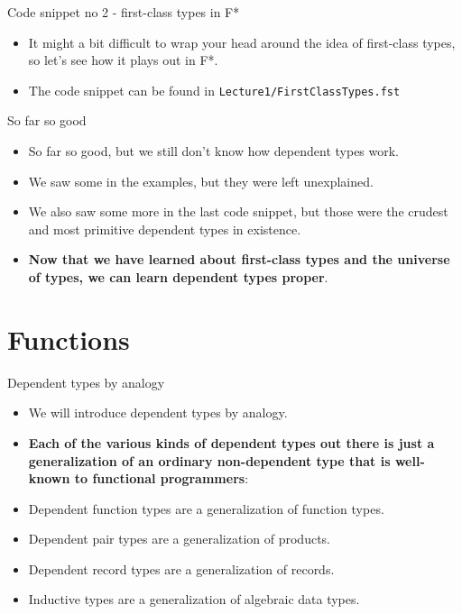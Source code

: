 \documentclass{beamer}
\newcommand{\m}[1]{\texttt{#1}}
\begin{document}
\begin{frame}{Code snippet no 2 - first-class types in F*}
\begin{itemize}
	\item It might a bit difficult to wrap your head around the idea of first-class types, so let's see how it plays out in F*.
	\item The code snippet can be found in \m{Lecture1/FirstClassTypes.fst}
\end{itemize}
\end{frame}

\begin{frame}{So far so good}
\begin{itemize}
	\item So far so good, but we still don't know how dependent types work.
	\item We saw some in the examples, but they were left unexplained.
	\item We also saw some more in the last code snippet, but those were the crudest and most primitive dependent types in existence.
	\item \textbf{Now that we have learned about first-class types and the universe of types, we can learn dependent types proper}.
\end{itemize}
\end{frame}

\section{Functions}

\begin{frame}{Dependent types by analogy}
\begin{itemize}
	\item We will introduce dependent types by analogy.
	\item \textbf{Each of the various kinds of dependent types out there is just a generalization of an ordinary non-dependent type that is well-known to functional programmers}:
	\item Dependent function types are a generalization of function types.
	\item Dependent pair types are a generalization of products.
	\item Dependent record types are a generalization of records.
	\item Inductive types are a generalization of algebraic data types.
\end{itemize}
\end{frame}
\end{document}
